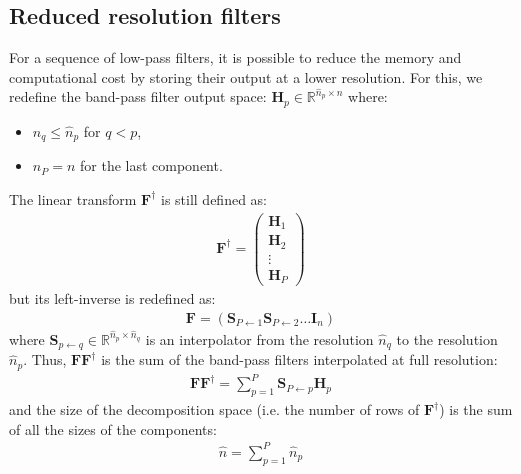 \documentclass[12pt]{scrartcl}
\begin{document}
\subsection{Reduced resolution filters}

For a sequence of low-pass filters, it is possible to reduce the memory and computational cost by storing their output at a lower resolution. For this, we redefine the band-pass filter output space: $\mathbf{H}_p \in \mathbb{R}^{\widehat{n}_p \times n}$ where:
\begin{itemize}
\item $\widehat{n}_q \le \widehat{n}_p$ for $q < p$,
\item $\widehat{n}_P = n$ for the last component.
\end{itemize}
The linear transform $\mathbf{F}^\dag$ is still defined as:
\begin{align}
\mathbf{F}^\dag = \left( \begin{array}{c}
\mathbf{H}_1 \\
\mathbf{H}_2 \\
\vdots \\
\mathbf{H}_P
\end{array}
\right)
\end{align}
but its left-inverse is redefined as:
\begin{align}
\mathbf{F} = \left(\mathbf{S}_{P \leftarrow 1} \mathbf{S}_{P \leftarrow 2} \dots \mathbf{I}_n\right)
\end{align}
where $\mathbf{S}_{p \leftarrow q} \in \mathbb{R}^{\widehat{n}_p \times \widehat{n}_q}$ is an interpolator from the resolution $\widehat{n}_q$ to the resolution $\widehat{n}_p$. Thus, $\mathbf{F} \mathbf{F}^\dag$ is the sum of the band-pass filters interpolated at full resolution:
\begin{align}
\mathbf{F} \mathbf{F}^\dag = \sum_{p=1}^P \mathbf{S}_{P \leftarrow p} \mathbf{H}_p
\end{align}
and the size of the decomposition space (i.e. the number of rows of $\mathbf{F}^\dag$) is the sum of all the sizes of the components:
\begin{align}
\widehat{n} = \sum_{p=1}^P \widehat{n}_p
\end{align}
\end{document}
